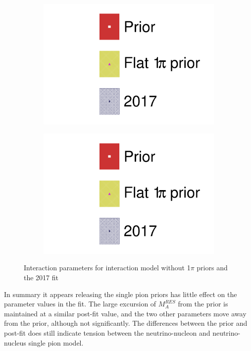\begin{figure}[h]
	\begin{subfigure}[t]{0.49\textwidth}
		\includegraphics[width=\textwidth, trim={0mm 0mm 0mm 0mm}, clip,page=20]{figures/mach3/data/alt/2017b_FlatPion_Data_merg_2017b_NewData_NewDet_UpdXsecStep_2Xsec_4Det_5Flux_0.pdf}
	\end{subfigure}
	\begin{subfigure}[t]{0.49\textwidth}
		\includegraphics[width=\textwidth, trim={0mm 0mm 0mm 0mm}, clip,page=21]{figures/mach3/data/alt/2017b_FlatPion_Data_merg_2017b_NewData_NewDet_UpdXsecStep_2Xsec_4Det_5Flux_0.pdf}
	\end{subfigure}
	\caption{Interaction parameters for interaction model without 1$\pi$ priors and the 2017 fit}
	\label{fig:1pi_prior_xsec}
\end{figure}

In summary it appears releasing the single pion priors has little effect on the parameter values in the fit. The large excursion of $M_A^{RES}$ from the prior is maintained at a similar post-fit value, and the two other parameters move away from the prior, although not significantly. The differences between the prior and post-fit does still indicate tension between the neutrino-nucleon and neutrino-nucleus single pion model.

